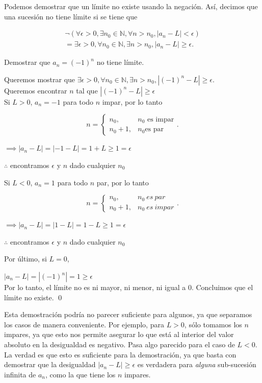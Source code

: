 \documentclass[12pt]{book}
\begin{document}
Podemos demostrar que un límite no existe usando la negación. Así, decimos que una sucesión no tiene límite si se tiene que 

\begin{align*}
    \neg(\forall \epsilon >0, \exists n_0 \in \mathbb{N}, \forall n>n_0, |a_n-L|<\epsilon)\\
    =\exists\epsilon>0, \forall n_0  \in \mathbb{N}, \exists n>n_0, |a_n-L|\ge\epsilon.
\end{align*}

\begin{exampleenv}

Demostrar que $a_n=(-1)^n$ no tiene límite.

Queremos mostrar que $\exists\epsilon>0, \forall n_0  \in \mathbb{N}, \exists n>n_0, |(-1)^n-L|\ge\epsilon$.\\

Queremos encontrar $n$ tal que $|(-1)^n-L|\ge \epsilon$\\

Si $L>0$, $a_n=-1$ para todo $n$ impar, por lo tanto

\[
n =
\begin{cases}
    n_0, &  n_0 \text{ es impar} \\
    n_0+1, & n_0 \text{es par}
\end{cases}.
\]

$\implies |a_n-L|=|-1-L|=1+L\ge1=\epsilon$

$\therefore$ encontramos $\epsilon$ y $n$ dado cualquier $n_0$

Si $L<0$, $a_n=1$ para todo $n$ par, por lo tanto

\[
n =
\begin{cases}
    n_0, &  n_0 \ es \ par \\
    n_0+1, & n_0 \ es \ impar
\end{cases}.
\]

$\implies |a_n-L|=|1-L|=1-L\ge 1=\epsilon$

$\therefore$ encontramos $\epsilon$ y $n$ dado cualquier $n_0$

Por último, si $L=0$,

$|a_n-L|=|(-1)^n|=1\ge \epsilon$\\

Por lo tanto, el límite no es ni mayor, ni menor, ni igual a 0. Concluimos que el límite no existe. \qed
\end{exampleenv}

Esta demostración podría no parecer suficiente para algunos, ya que separamos los casos de manera conveniente. Por ejemplo, para $L>0$, sólo tomamos los $n$ impares, ya que esto nos permite asegurar lo que está al interior del valor absoluto en la desigualdad es negativo. Pasa algo parecido para el caso de $L<0$. La verdad es que esto es suficiente para la demostración, ya que basta con demostrar que la desigualdad $|a_n-L|\ge \epsilon$ es verdadera para \textit{alguna} sub-sucesión infinita de $a_n$, como la que tiene los $n$ impares.
\end{document}
